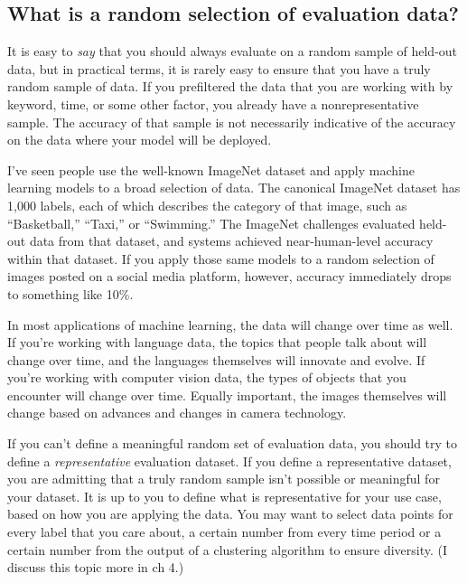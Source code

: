 \documentclass[sigconf,nonacm,screen,pbalance]{acmart}
\begin{document}
\subsection{What is a random selection of evaluation data?}
It
is
easy to \emph{say} that you should always evaluate on a random sample of held-out data,
but in practical terms, it is rarely easy to ensure that you have a truly random sample
of data. If you prefiltered the data that you are working with by keyword, time, or some
other factor, you already have a nonrepresentative sample. The accuracy of that sample
is not necessarily indicative of the accuracy on the data where your model will be
deployed.

I've
seen people use the well-known ImageNet dataset and apply machine learning models to a
broad selection of data. The canonical ImageNet dataset has 1,000 labels, each of which
describes the category of that image, such as ``Basketball,'' ``Taxi,'' or ``Swimming.'' The
ImageNet challenges evaluated held-out data from that dataset, and systems achieved
near-human-level accuracy within that dataset. If you apply those same models to a
random selection of images posted on a social media platform, however, accuracy
immediately drops to something like 10\%.

In
most applications of machine learning, the data will change over time as well. If you're
working with language data, the topics that people talk about will change over time, and
the languages themselves will innovate and evolve. If you're working with computer
vision data, the types of objects that you encounter will change over time. Equally
important, the images themselves will change based on advances and changes in camera
technology.

If
you can't define a meaningful random set of evaluation data, you should try to define a
\emph{representative} evaluation dataset.
If you define a representative dataset, you are admitting that a truly random sample
isn't possible or meaningful for your dataset. It is up to you to define what is
representative for your use case, based on how you are applying the data. You may want
to select data points for every label that you care about, a certain number from every
time period or a certain number from the output of a clustering algorithm to ensure
diversity. (I discuss this topic more in ch 4.)
\end{document}
